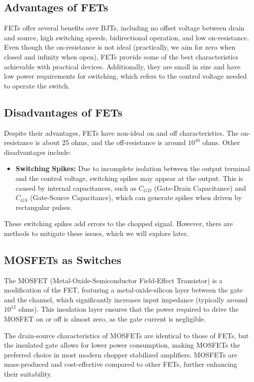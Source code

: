 \subsection{Advantages of FETs}
FETs offer several benefits over BJTs, including no offset voltage between drain and source, high switching speeds, bidirectional operation, and low on-resistance. Even though the on-resistance is not ideal (practically, we aim for zero when closed and infinity when open), FETs provide some of the best characteristics achievable with practical devices. Additionally, they are small in size and have low power requirements for switching, which refers to the control voltage needed to operate the switch.

\subsection{Disadvantages of FETs}
Despite their advantages, FETs have non-ideal on and off characteristics. The on-resistance is about 25 ohms, and the off-resistance is around $10^{10}$ ohms. Other disadvantages include:
\begin{itemize}
    \item \textbf{Switching Spikes:} Due to incomplete isolation between the output terminal and the control voltage, switching spikes may appear at the output. This is caused by internal capacitances, such as $C_{GD}$ (Gate-Drain Capacitance) and $C_{GS}$ (Gate-Source Capacitance), which can generate spikes when driven by rectangular pulses.
\end{itemize}
These switching spikes add errors to the chopped signal. However, there are methods to mitigate these issues, which we will explore later.

\subsection{MOSFETs as Switches}
The MOSFET (Metal-Oxide-Semiconductor Field-Effect Transistor) is a modification of the FET, featuring a metal-oxide-silicon layer between the gate and the channel, which significantly increases input impedance (typically around $10^{12}$ ohms). This insulation layer ensures that the power required to drive the MOSFET on or off is almost zero, as the gate current is negligible.

The drain-source characteristics of MOSFETs are identical to those of FETs, but the insulated gate allows for lower power consumption, making MOSFETs the preferred choice in most modern chopper stabilized amplifiers. MOSFETs are mass-produced and cost-effective compared to other FETs, further enhancing their suitability.

